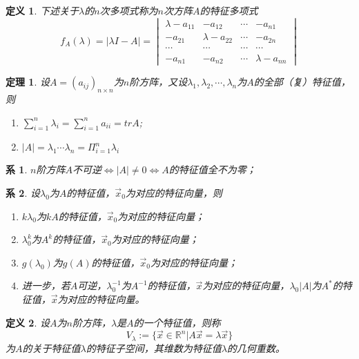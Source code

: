\documentclass[a4paper]{book}
\newtheorem{Def}{定义}[chapter]
\newtheorem{cor}{系}[chapter]
\newtheorem{thm}{定理}[chapter]
\begin{document}
\begin{Def}
下述关于$\lambda$的$n$次多项式称为$n$次方阵$A$的特征多项式
\begin{equation*}
f_A(\lambda)=|\lambda I-A|
=\begin{vmatrix}\lambda-a_{11}&-a_{12}&\cdots&-a_{n1}\\
-a_{21}&\lambda-a_{22}&\cdots&-a_{2n}\\
\cdots&\cdots&\cdots&\cdots\\
-a_{n1}&-a_{n2}&\cdots&\lambda-a_{nn}\end{vmatrix}
\end{equation*}
\end{Def}

\begin{thm}
设$A=(a_{ij})_{n\times n}$为$n$阶方阵，又设$\lambda_1,\lambda_2,\cdots,\lambda_n$为$A$的全部（复）特征值，则
\begin{enumerate}
  \item $\sum_{i=1}^n\lambda_i=\sum_{i=1}^na_{ii}=trA$;
  \item $|A|=\lambda_1\cdots\lambda_n=\Pi_{i=1}^n\lambda_i$
\end{enumerate}
\end{thm}

\begin{cor}
$n$阶方阵$A$不可逆$\Leftrightarrow$$|A|\neq 0$$\Leftrightarrow$$A$的特征值全不为零；
\end{cor}

\begin{cor}
设$\lambda_0$为$A$的特征值，$\vec{x}_0$为对应的特征向量，则
\begin{enumerate}
  \item $k\lambda_0$为$kA$的特征值，$\vec{x}_0$为对应的特征向量；
  \item $\lambda_0^k$为$A^k$的特征值，$\vec{x}_0$为对应的特征向量；
  \item $g(\lambda_0)$为$g(A)$的特征值，$\vec{x}_0$为对应的特征向量；
  \item 进一步，若$A$可逆，$\lambda^{-1}_0$为$A^{-1}$的特征值，$\vec{x}$为对应的特征向量，$\lambda_0|A|$为$A^{*}$的特征值，$\vec{x}$为对应的特征向量。
\end{enumerate}
\end{cor}

\begin{Def}
设$A$为$n$阶方阵，$\lambda$是$A$的一个特征值，则称
$$V_{\lambda}:=\{\vec{x}\in\mathbb{R}^n|A\vec{x}=\lambda\vec{x}\}$$
为$A$的关于特征值$\lambda$的特征子空间，其维数为特征值$\lambda$的几何重数。
\end{Def}
\end{document}

